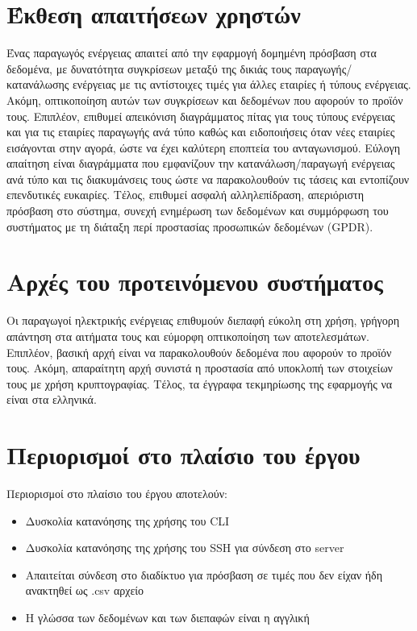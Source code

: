 \documentclass[a4paper,12pt, oneside]{article}
\begin{document}
\section{Έκθεση απαιτήσεων χρηστών}
Ένας παραγωγός ενέργειας απαιτεί από την εφαρμογή δομημένη πρόσβαση στα δεδομένα, με δυνατότητα συγκρίσεων μεταξύ της δικιάς τους παραγωγής/κατανάλωσης ενέργειας με τις αντίστοιχες τιμές για άλλες εταιρίες ή τύπους ενέργειας. Ακόμη, οπτικοποίηση αυτών των συγκρίσεων και δεδομένων που αφορούν το προϊόν τους. Επιπλέον, επιθυμεί απεικόνιση διαγράμματος πίτας για τους τύπους ενέργειας και για τις εταιρίες παραγωγής ανά τύπο καθώς και ειδοποιήσεις όταν νέες εταιρίες εισάγονται στην αγορά, ώστε να έχει καλύτερη εποπτεία του ανταγωνισμού. Εύλογη απαίτηση είναι διαγράμματα που εμφανίζουν την κατανάλωση/παραγωγή ενέργειας ανά τύπο και τις διακυμάνσεις τους ώστε να παρακολουθούν τις τάσεις και εντοπίζουν επενδυτικές ευκαιρίες. Τέλος, επιθυμεί ασφαλή  αλληλεπίδραση, απεριόριστη πρόσβαση στο σύστημα, συνεχή ενημέρωση των δεδομένων και συμμόρφωση του συστήματος με τη διάταξη περί προστασίας προσωπικών δεδομένων \textlatin{(GPDR)}.


\section{Αρχές του προτεινόμενου συστήματος}
Οι παραγωγοί ηλεκτρικής ενέργειας επιθυμούν διεπαφή εύκολη στη χρήση, γρήγορη απάντηση στα αιτήματα τους και εύμορφη οπτικοποίηση των αποτελεσμάτων. Επιπλέον, βασική αρχή είναι να παρακολουθούν δεδομένα που αφορούν το προϊόν τους. Ακόμη, απαραίτητη αρχή συνιστά η προστασία από υποκλοπή των στοιχείων τους με χρήση κρυπτογραφίας. Τέλος, τα έγγραφα τεκμηρίωσης της εφαρμογής να είναι στα ελληνικά.


\section{Περιορισμοί στο πλαίσιο του έργου}
Περιορισμοί στο πλαίσιο του έργου αποτελούν:
\begin{itemize}
  \item Δυσκολία κατανόησης της χρήσης του \textlatin{CLI}
  \item Δυσκολία κατανόησης της χρήσης του \textlatin{SSH} για σύνδεση στο \textlatin{server}
  \item Απαιτείται σύνδεση στο διαδίκτυο για πρόσβαση σε τιμές που δεν είχαν ήδη ανακτηθεί ως \textlatin{.csv} αρχείο
  \item Η γλώσσα των δεδομένων και των διεπαφών είναι η αγγλική
\end{itemize}
\newpage
\end{document}
